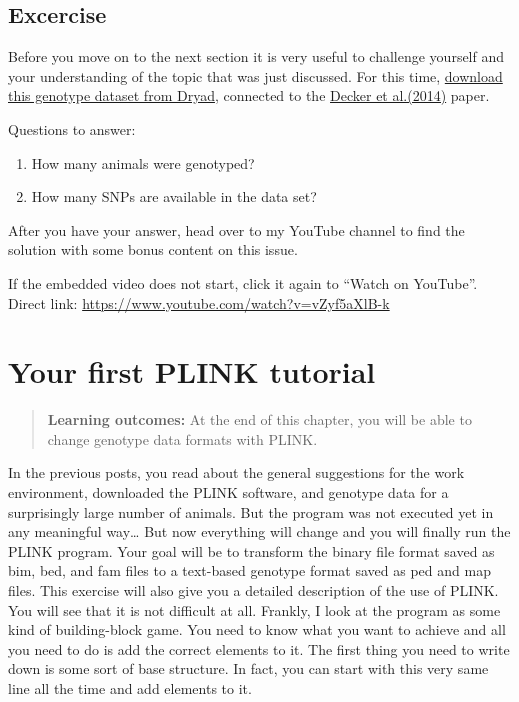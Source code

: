 \documentclass[]{book}
\begin{document}
\section{Excercise}\label{excercise-1}

Before you move on to the next section it is very useful to challenge
yourself and your understanding of the topic that was just discussed.
For this time,
\href{https://datadryad.org/stash/dataset/doi:10.5061/dryad.th092}{download
this genotype dataset from Dryad}, connected to the
\href{https://journals.plos.org/plosgenetics/article?id=10.1371/journal.pgen.1004254}{Decker
et al.(2014)} paper.

Questions to answer:

\begin{enumerate}
\def\labelenumi{\alph{enumi})}
\item
  How many animals were genotyped?
\item
  How many SNPs are available in the data set?
\end{enumerate}

After you have your answer, head over to my YouTube channel to find the
solution with some bonus content on this issue.

If the embedded video does not start, click it again to ``Watch on
YouTube''. Direct link:
\url{https://www.youtube.com/watch?v=vZyf5aXlB-k}

\hypertarget{your-first-plink-tutorial}{\chapter{Your first PLINK
tutorial}\label{your-first-plink-tutorial}}

\begin{quote}
\textbf{Learning outcomes:} At the end of this chapter, you will be able
to change genotype data formats with PLINK.
\end{quote}

In the previous posts, you read about the general suggestions for the
work environment, downloaded the PLINK software, and genotype data for a
surprisingly large number of animals. But the program was not executed
yet in any meaningful way\ldots{} But now everything will change and you
will finally run the PLINK program. Your goal will be to transform the
binary file format saved as bim, bed, and fam files to a text-based
genotype format saved as ped and map files. This exercise will also give
you a detailed description of the use of PLINK. You will see that it is
not difficult at all. Frankly, I look at the program as some kind of
building-block game. You need to know what you want to achieve and all
you need to do is add the correct elements to it. The first thing you
need to write down is some sort of base structure. In fact, you can
start with this very same line all the time and add elements to it.
\end{document}
